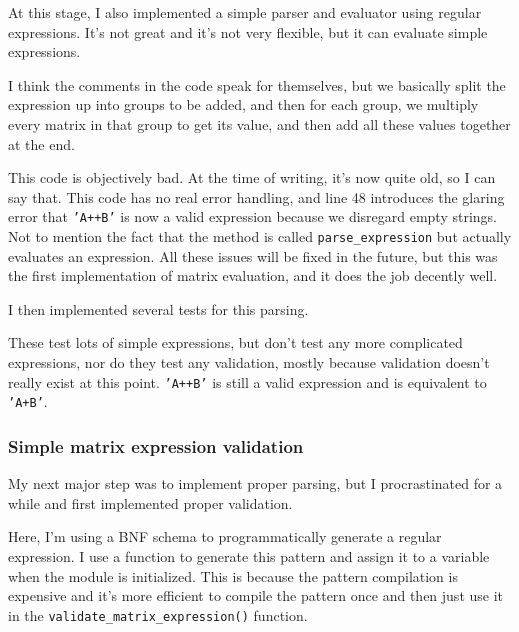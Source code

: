 \documentclass[../main.tex]{subfiles}
\begin{document}
At this stage, I also implemented a simple parser and evaluator using regular expressions. It's not great and it's not very flexible, but it can evaluate simple expressions.


I think the comments in the code speak for themselves, but we basically split the expression up into groups to be added, and then for each group, we multiply every matrix in that group to get its value, and then add all these values together at the end.

This code is objectively bad. At the time of writing, it's now quite old, so I can say that. This code has no real error handling, and line 48 introduces the glaring error that \texttt{'A++B'} is now a valid expression because we disregard empty strings. Not to mention the fact that the method is called \texttt{parse\_expression} but actually evaluates an expression. All these issues will be fixed in the future, but this was the first implementation of matrix evaluation, and it does the job decently well.

I then implemented several tests for this parsing.


These test lots of simple expressions, but don't test any more complicated expressions, nor do they test any validation, mostly because validation doesn't really exist at this point. \texttt{'A++B'} is still a valid expression and is equivalent to \texttt{'A+B'}.

\subsubsection{Simple matrix expression validation\label{development:matrices-backend:simple-matrix-expression-validation}}

My next major step was to implement proper parsing, but I procrastinated for a while and first implemented proper validation.


Here, I'm using a BNF schema to programmatically generate a regular expression. I use a function to generate this pattern and assign it to a variable when the module is initialized. This is because the pattern compilation is expensive and it's more efficient to compile the pattern once and then just use it in the \texttt{validate\_matrix\_expression()} function.
\end{document}
